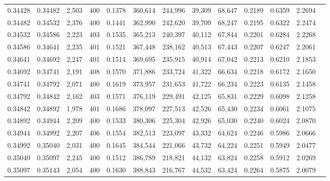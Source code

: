 \begin{tabular}{rrrrrrrrrrrrr}
0.34428 & 0.34482 &  2,503 & 400 &                                     0.1378 & 360,614 & 244,996 &  39,309 &  68,647 & 0.2189 & 0.6359 & 2.2694 \\
0.34482 & 0.34532 &  2,376 & 400 &                                     0.1441 & 362,990 & 242,620 &  39,709 &  68,247 & 0.2195 & 0.6322 & 2.2474 \\
0.34532 & 0.34586 &  2,223 & 403 &                                     0.1535 & 365,213 & 240,397 &  40,112 &  67,844 & 0.2201 & 0.6284 & 2.2268 \\
0.34586 & 0.34641 &  2,235 & 401 &                                     0.1521 & 367,448 & 238,162 &  40,513 &  67,443 & 0.2207 & 0.6247 & 2.2061 \\
0.34641 & 0.34692 &  2,247 & 401 &                                     0.1514 & 369,695 & 235,915 &  40,914 &  67,042 & 0.2213 & 0.6210 & 2.1853 \\
0.34692 & 0.34741 &  2,191 & 408 &                                     0.1570 & 371,886 & 233,724 &  41,322 &  66,634 & 0.2218 & 0.6172 & 2.1650 \\
0.34741 & 0.34792 &  2,071 & 400 &                                     0.1619 & 373,957 & 231,653 &  41,722 &  66,234 & 0.2223 & 0.6135 & 2.1458 \\
0.34792 & 0.34842 &  2,162 & 403 &                                     0.1571 & 376,119 & 229,491 &  42,125 &  65,831 & 0.2229 & 0.6098 & 2.1258 \\
0.34842 & 0.34892 &  1,978 & 401 &                                     0.1686 & 378,097 & 227,513 &  42,526 &  65,430 & 0.2234 & 0.6061 & 2.1075 \\
0.34892 & 0.34944 &  2,209 & 400 &                                     0.1533 & 380,306 & 225,304 &  42,926 &  65,030 & 0.2240 & 0.6024 & 2.0870 \\
0.34944 & 0.34992 &  2,207 & 406 &                                     0.1554 & 382,513 & 223,097 &  43,332 &  64,624 & 0.2246 & 0.5986 & 2.0666 \\
0.34992 & 0.35040 &  2,031 & 400 &                                     0.1645 & 384,544 & 221,066 &  43,732 &  64,224 & 0.2251 & 0.5949 & 2.0477 \\
0.35040 & 0.35097 &  2,245 & 400 &                                     0.1512 & 386,789 & 218,821 &  44,132 &  63,824 & 0.2258 & 0.5912 & 2.0269 \\
0.35097 & 0.35143 &  2,054 & 400 &                                     0.1630 & 388,843 & 216,767 &  44,532 &  63,424 & 0.2264 & 0.5875 & 2.0079 \\

\end{tabular}
